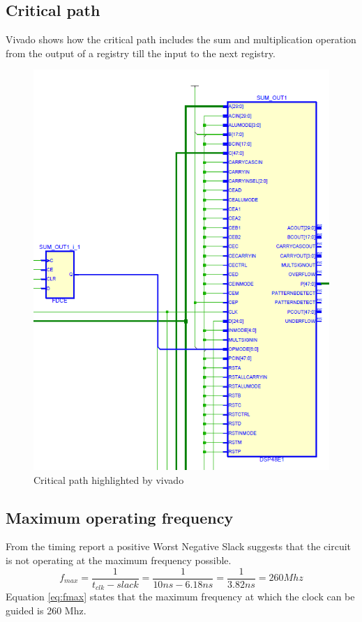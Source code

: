 \subsection{Critical path} %
\label{sub:critical_path}
Vivado shows how the critical path includes the sum and multiplication operation from the output of a registry till the input to the next registry.
\begin{figure}[H]
  \centering
  \includegraphics[width=0.9\linewidth]{./images/critical}
  \caption{Critical path highlighted by vivado}
  \label{fig:critical}
\end{figure}
\subsection{Maximum operating frequency} %
\label{sub:maximum_operating_frequency}
From the timing report a positive Worst Negative Slack suggests that the circuit is not operating at the maximum frequency possible.
\begin{equation}
	f_{max} = \frac{1}{t_{clk}-slack}=\frac{1}{10ns-6.18ns}= \frac{1}{3.82ns}= 260 Mhz
	\label{eq:fmax}
\end{equation}
Equation \ref{eq:fmax} states that the maximum frequency at which the clock can be guided is 260 Mhz.


